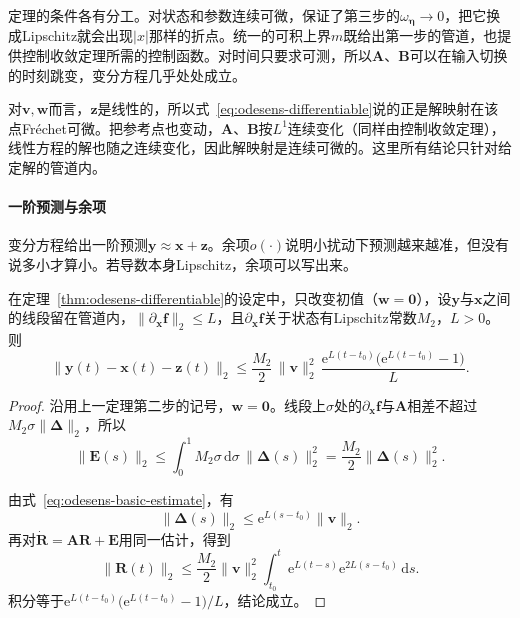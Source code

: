 定理的条件各有分工。对状态和参数连续可微，保证了第三步的$\omega_{\bm{\eta}}\to0$，把它换成Lipschitz就会出现$\lvert x\rvert$那样的折点。统一的可积上界$m$既给出第一步的管道，也提供控制收敛定理所需的控制函数。对时间只要求可测，所以$\bm{A}$、$\bm{B}$可以在输入切换的时刻跳变，变分方程几乎处处成立。

对$\bm{v},\bm{w}$而言，$\bm{z}$是线性的，所以式~\eqref{eq:odesens-differentiable}说的正是解映射在该点Fréchet可微。把参考点也变动，$\bm{A}$、$\bm{B}$按$L^1$连续变化（同样由控制收敛定理），线性方程的解也随之连续变化，因此解映射是连续可微的。这里所有结论只针对给定解的管道内。

\paragraph{一阶预测与余项}
变分方程给出一阶预测$\bm{y}\approx\bm{x}+\bm{z}$。余项$o(\cdot)$说明小扰动下预测越来越准，但没有说多小才算小。若导数本身Lipschitz，余项可以写出来。

\begin{theorem}[一阶预测的余项]
\label{thm:odesens-remainder}
在定理~\ref{thm:odesens-differentiable}的设定中，只改变初值（$\bm{w}=\bm{0}$），设$\bm{y}$与$\bm{x}$之间的线段留在管道内，$\lVert\partial_{\bm{x}}\bm{f}\rVert_2\leq L$，且$\partial_{\bm{x}}\bm{f}$关于状态有Lipschitz常数$M_2$，$L>0$。则
\begin{equation}
 \lVert\bm{y}(t)-\bm{x}(t)-\bm{z}(t)\rVert_2\leq\frac{M_2}{2}\,\lVert\bm{v}\rVert_2^2\,\frac{\mathrm{e}^{L(t-t_0)}\bigl(\mathrm{e}^{L(t-t_0)}-1\bigr)}{L}.
 \label{eq:odesens-remainder}
\end{equation}
\end{theorem}

\begin{proof}
沿用上一定理第二步的记号，$\bm{w}=\bm{0}$。线段上$\sigma$处的$\partial_{\bm{x}}\bm{f}$与$\bm{A}$相差不超过$M_2\sigma\lVert\bm{\Delta}\rVert_2$，所以
\[
 \lVert\bm{E}(s)\rVert_2\leq\int_0^1M_2\sigma\,\mathrm{d}\sigma\,\lVert\bm{\Delta}(s)\rVert_2^2=\frac{M_2}{2}\lVert\bm{\Delta}(s)\rVert_2^2.
\]

由式~\eqref{eq:odesens-basic-estimate}，有
\[
 \lVert\bm{\Delta}(s)\rVert_2\leq\mathrm{e}^{L(s-t_0)}\lVert\bm{v}\rVert_2.
\]
再对$\dot{\bm{R}}=\bm{A}\bm{R}+\bm{E}$用同一估计，得到
\[
 \lVert\bm{R}(t)\rVert_2\leq\frac{M_2}{2}\lVert\bm{v}\rVert_2^2\int_{t_0}^{t}\mathrm{e}^{L(t-s)}\mathrm{e}^{2L(s-t_0)}\,\mathrm{d}s.
\]
积分等于$\mathrm{e}^{L(t-t_0)}\bigl(\mathrm{e}^{L(t-t_0)}-1\bigr)/L$，结论成立。
\end{proof}

